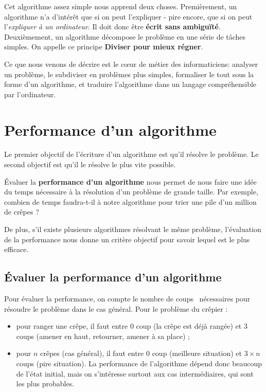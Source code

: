 Cet algorithme assez simple nous apprend deux choses. Premièrement, un
algorithme n'a d'intérêt que si on peut l'expliquer - pire encore, que si on
peut l'\textit{expliquer à un ordinateur}. Il doit donc être \textbf{écrit sans
  ambiguïté}. Deuxièmement, un algorithme décompose le problème en une série de
tâches simples. On appelle ce principe \textbf{\og Diviser pour mieux
  régner\fg}.

Ce que nous venons de décrire est le c\oe{}ur de métier des informaticiens:
analyser un problème, le subdiviser en problèmes plus simples, formaliser le
tout sous la forme d'un algorithme, et traduire l'algorithme dans un langage
compréhensible par l'ordinateur.

\section*{Performance d'un algorithme}

Le premier objectif de l'écriture d'un algorithme est qu'il résolve le
problème. Le second objectif est qu'il le résolve le plus vite possible.

Évaluer la \textbf{performance d'un algorithme} nous permet de nous faire une
idée du temps nécessaire à la résolution d'un problème de grande taille. Par
exemple, combien de temps faudra-t-il à notre algorithme pour trier une pile
d'un million de crêpes ?

De plus, s'il existe plusieurs algorithmes résolvant le même problème,
l'évaluation de la performance nous donne un critère objectif pour savoir lequel
est le plus efficace.

\subsection*{Évaluer la performance d'un algorithme}

Pour évaluer la performance, on compte le nombre de \og coups \fg\ nécessaires
pour résoudre le problème dans le cas général. Pour le problème du crêpier :

\begin{itemize}
\item pour ranger une crêpe, il faut entre $0$ coup (la crêpe est déjà rangée)
  et $3$ coups (amener en haut, retourner, amener à sa place) ;
\item pour $n$ crêpes (cas général), il faut entre $0$ coup (meilleure
  situation) et $3 \times n$ coups (pire situation). La performance de
  l'algorithme dépend donc beaucoup de l'état initial, mais on s'intéresse
  surtout aux cas intermédiaires, qui sont les plus probables.
\end{itemize}

